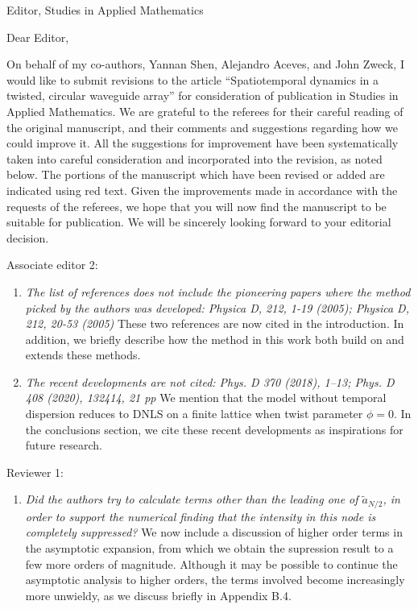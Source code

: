 \documentclass[11pt]{letter}
\begin{document}
\address{Ross Parker \\
Department of Mathematics \\
Southern Methodist University \\
Dallas, TX 75275 \\
\texttt{rhparker@smu.edu}}%
\signature{Ross Parker}
\begin{letter}{Editor, Studies in Applied Mathematics}

\opening{Dear Editor,}

On behalf of my co-authors, Yannan Shen, Alejandro Aceves, and John Zweck, I would like to submit revisions to the article ``Spatiotemporal dynamics in a twisted, circular waveguide array'' for consideration of publication in Studies in Applied Mathematics. We are grateful to the referees for their careful reading of the original manuscript, and their comments and suggestions regarding how we could improve it. All the suggestions for improvement have been systematically taken into careful consideration and incorporated into the revision, as noted below. The portions of the manuscript which have been revised or added are indicated using red text. Given the improvements made in accordance with the requests of the referees, we hope that you will now find the manuscript to be suitable for publication. We will be sincerely looking forward to your editorial decision.

Associate editor 2:
\begin{enumerate}
    \item \emph{The list of references does not include the pioneering papers where the method picked by the authors was developed: Physica D, 212, 1-19 (2005); Physica D, 212, 20-53 (2005)} These two references are now cited in the introduction. In addition, we briefly describe how the method in this work both build on and extends these methods.
    \vspace{4mm}

    \item \emph{The recent developments are not cited: Phys. D 370 (2018), 1–13;  Phys. D 408 (2020), 132414, 21 pp} We mention that the model without temporal dispersion reduces to DNLS on a finite lattice when twist parameter $\phi = 0$. In the conclusions section, we cite these recent developments as inspirations for future research.
    \vspace{4mm}
\end{enumerate}

Reviewer 1:
\begin{enumerate}
    \item \emph{Did the authors try to calculate terms other than the leading one of $\tilde{a}_{N/2}$, in order to support the numerical finding that the intensity in this node is completely suppressed?} We now include a discussion of higher order terms in the asymptotic expansion, from which we obtain the supression result to a few more orders of magnitude. Although it may be possible to continue the asymptotic analysis to higher orders, the terms involved become increasingly more unwieldy, as we discuss briefly in Appendix B.4.
    \vspace{4mm}


\end{enumerate}
\end{letter}
\end{document}
